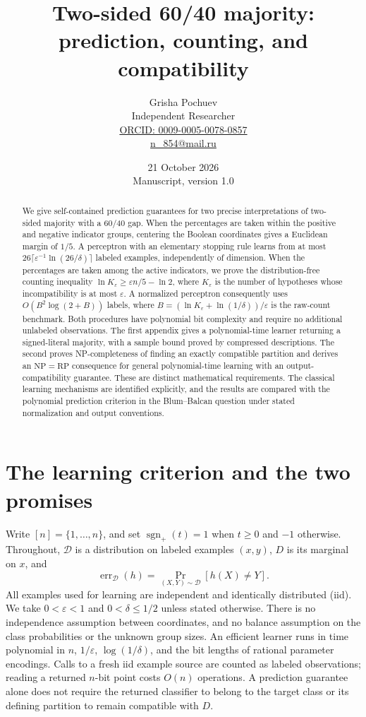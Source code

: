 \documentclass[11pt,a4paper]{article}
\title{Two-sided 60/40 majority:\\prediction, counting, and compatibility}
\author{Grisha Pochuev\\\small Independent Researcher\\
\small\href{https://orcid.org/0009-0005-0078-0857}{ORCID: 0009-0005-0078-0857}\\
\small\href{mailto:n_854@mail.ru}{n\_854@mail.ru}}
\date{21 October 2026\\[4pt]\small Manuscript, version 1.0}
\theoremstyle{remark}
\newcommand{\sgnplus}{\operatorname{sgn}_{+}}
\newcommand{\err}{\operatorname{err}}
\newcommand{\1}{\mathbf 1}
\newcommand{\RP}{\mathrm{RP}}
\newcommand{\NP}{\mathrm{NP}}
\begin{document}
\maketitle

\begin{abstract}
We give self-contained prediction guarantees for two precise interpretations of
two-sided majority with a 60/40 gap. When the percentages are taken within the
positive and negative indicator groups, centering the Boolean coordinates gives
a Euclidean margin of $1/5$. A perceptron with an elementary stopping rule learns
from at most $26\lceil\varepsilon^{-1}\ln(26/\delta)\rceil$ labeled examples,
independently of dimension. When the percentages are taken among the active
indicators, we prove the distribution-free counting inequality
$\ln K_\varepsilon\ge \varepsilon n/5-\ln2$, where $K_\varepsilon$ is the number
of hypotheses whose incompatibility is at most $\varepsilon$. A normalized
perceptron consequently uses $O(B^2\log(2+B))$ labels, where
$B=(\ln K_\varepsilon+\ln(1/\delta))/\varepsilon$ is the raw-count benchmark.
Both procedures have polynomial bit complexity and require no additional
unlabeled observations. The first appendix gives a polynomial-time learner
returning a signed-literal majority, with a sample bound proved by compressed
descriptions. The second proves NP-completeness of finding an exactly compatible
partition and derives an $\NP=\RP$ consequence for general polynomial-time
learning with an output-compatibility guarantee. These are distinct mathematical
requirements. The classical learning mechanisms are identified explicitly,
and the results are compared with the polynomial prediction criterion in the
Blum--Balcan question under stated normalization and output conventions.
\end{abstract}

\section{The learning criterion and the two promises}

Write $[n]=\{1,\ldots,n\}$, and set $\sgnplus(t)=1$ when $t\ge0$ and $-1$
otherwise. Throughout, $\mathcal D$ is a distribution on labeled examples
$(x,y)$, $D$ is its marginal on $x$, and
\[
 \err_{\mathcal D}(h)=\Pr_{(X,Y)\sim\mathcal D}[h(X)\ne Y].
\]
All examples used for learning are independent and identically distributed
(iid). We take $0<\varepsilon<1$ and $0<\delta\le1/2$ unless stated otherwise.
There is no independence assumption between coordinates, and no balance
assumption on the class probabilities or the unknown group sizes.
An efficient learner runs in time polynomial in $n$, $1/\varepsilon$,
$\log(1/\delta)$, and the bit lengths of rational parameter encodings.
Calls to a fresh iid example source are counted as labeled observations;
reading a returned $n$-bit point costs $O(n)$ operations. A prediction guarantee
alone does not require the returned classifier to belong to the target class
or its defining partition to remain compatible with $D$.
\end{document}
